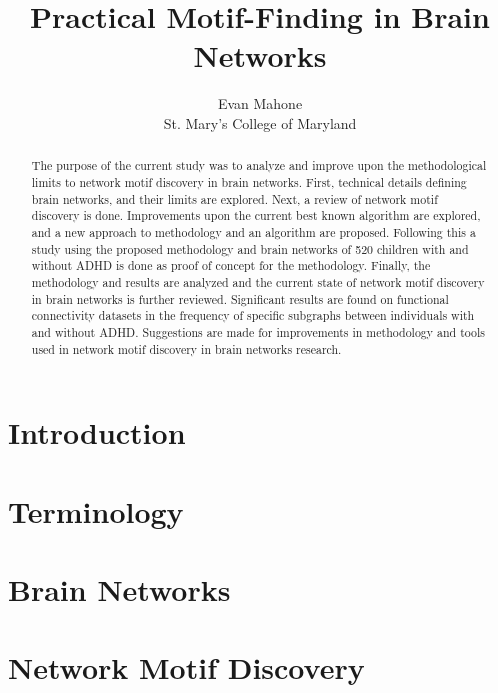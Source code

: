 \documentclass{article}
\title{Practical Motif-Finding in Brain Networks}
\author{Evan Mahone\\St. Mary's College of Maryland}
\begin{document}
\maketitle
\newpage

\begin{abstract}
The purpose of the current study was to analyze and improve upon the methodological limits to network motif discovery in brain networks. First, technical details defining brain networks, and their limits are explored. Next, a review of network motif discovery is done. Improvements upon the current best known algorithm are explored, and a new approach to methodology and an algorithm are proposed. Following this a study using the proposed methodology and brain networks of 520 children with and without ADHD is done as proof of concept for the methodology. Finally, the methodology and results are analyzed and the current state of network motif discovery in brain networks is further reviewed. Significant results are found on functional connectivity datasets in the frequency of specific subgraphs between individuals with and without ADHD. Suggestions are made for improvements in methodology and tools used in network motif discovery in brain networks research.
\end{abstract}

\section{Introduction}


\section{Terminology}


\section{Brain Networks}


\section{Network Motif Discovery}

\end{document}

